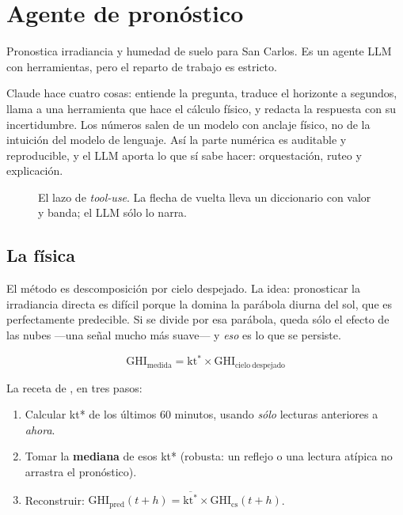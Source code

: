 \section{Agente de pronóstico}

Pronostica irradiancia y humedad de suelo para San Carlos. Es un agente LLM con
herramientas, pero el reparto de trabajo es estricto.

\begin{clave}[title=El LLM nunca toca los números]
Claude hace cuatro cosas: entiende la pregunta, traduce el horizonte a segundos, llama a
una herramienta que hace el cálculo físico, y redacta la respuesta con su incertidumbre.
Los números salen de un modelo con anclaje físico, no de la intuición del modelo de
lenguaje. Así la parte numérica es auditable y reproducible, y el LLM aporta lo que sí
sabe hacer: orquestación, ruteo y explicación.
\end{clave}

\begin{figure}[htbp]
\centering
\resizebox{\textwidth}{!}{}
\caption{El lazo de \emph{tool-use}. La flecha de vuelta lleva un diccionario con valor y
banda; el LLM sólo lo narra.}
\end{figure}

\subsection{La física}

El método es descomposición por cielo despejado. La idea: pronosticar la irradiancia
directa es difícil porque la domina la parábola diurna del sol, que es perfectamente
predecible. Si se divide por esa parábola, queda sólo el efecto de las nubes ---una señal
mucho más suave--- y \emph{eso} es lo que se persiste.

\begin{equation*}
  \mathrm{GHI_{medida}} = \mathrm{kt^*} \times \mathrm{GHI_{cielo\ despejado}}
\end{equation*}

La receta de , en tres pasos:

\begin{enumerate}[leftmargin=*,itemsep=2pt]
  \item Calcular kt* de los últimos 60 minutos, usando \emph{sólo} lecturas anteriores a
    \emph{ahora}.
  \item Tomar la \textbf{mediana} de esos kt* (robusta: un reflejo o una lectura atípica
    no arrastra el pronóstico).
  \item Reconstruir: $\mathrm{GHI_{pred}}(t+h) = \overline{\mathrm{kt^*}} \times
    \mathrm{GHI_{cs}}(t+h)$.
\end{enumerate}

